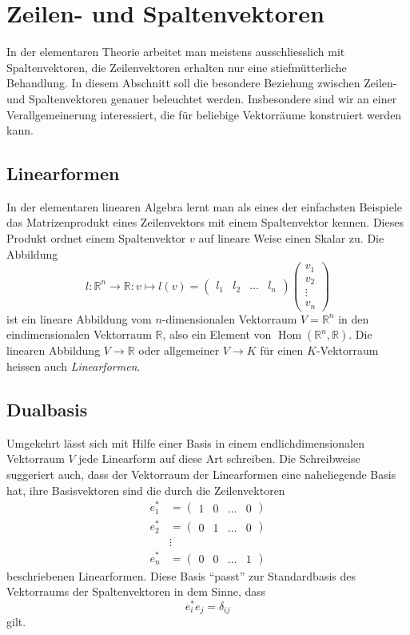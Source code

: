 %
%
%
\section{Zeilen- und Spaltenvektoren%
\label{section:dualraum:zeilenspalten}}
In der elementaren Theorie arbeitet man meistens ausschliesslich mit
Spaltenvektoren, die Zeilenvektoren erhalten nur eine stiefmütterliche
Behandlung.
In diesem Abschnitt soll die besondere Beziehung zwischen Zeilen- und
Spaltenvektoren genauer beleuchtet werden.
Insbesondere sind wir an einer Verallgemeinerung interessiert, die
für beliebige Vektorräume konstruiert werden kann.

\subsection{Linearformen}
In der elementaren linearen Algebra lernt man als eines der einfachsten
Beispiele das Matrizenprodukt eines Zeilenvektors mit einem Spaltenvektor
kennen.
Dieses Produkt ordnet einem Spaltenvektor $v$ auf lineare Weise einen Skalar zu.
Die Abbildung
\[
l\colon \mathbb R^n\to \mathbb R:
v\mapsto
l(v)
=
\begin{pmatrix}l_1&l_2&\dots&l_n\end{pmatrix}
\begin{pmatrix}v_1\\v_2\\\vdots\\v_n\end{pmatrix}
\]
ist ein lineare Abbildung vom $n$-dimensionalen Vektorraum $V=\mathbb R^n$
in den eindimensionalen Vektorraum $\mathbb R$, also ein Element von
$\operatorname{Hom}(\mathbb R^n, \mathbb R)$.
Die linearen Abbildung $V\to\mathbb R$ oder allgemeiner $V\to K$ für
einen $K$-Vektorraum heissen auch {\em Linearformen}.

\subsection{Dualbasis}
Umgekehrt lässt sich mit Hilfe einer Basis in einem endlichdimensionalen
Vektorraum $V$ jede Linearform auf diese Art schreiben.
Die Schreibweise suggeriert auch, dass der Vektorraum der Linearformen
eine naheliegende Basis hat, ihre Basisvektoren sind die durch die
Zeilenvektoren
\begin{align*}
e_1^*&=\begin{pmatrix}1&0&\dots&0\end{pmatrix}\\
e_2^*&=\begin{pmatrix}0&1&\dots&0\end{pmatrix}\\
&\vdots\\
e_n^*&=\begin{pmatrix}0&0&\dots&1\end{pmatrix}
\end{align*}
beschriebenen Linearformen.
Diese Basis ``passt'' zur Standardbasis des Vektorraums der Spaltenvektoren
in dem Sinne, dass
\[
e_i^* e_j = \delta_{ij}
\]
gilt.

